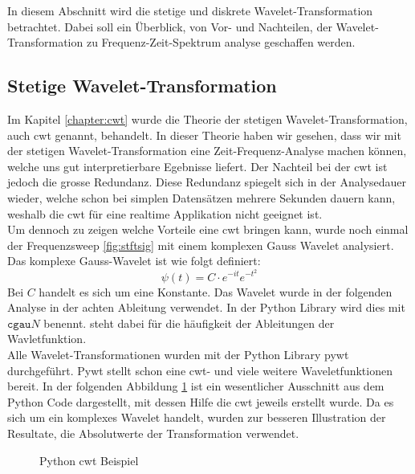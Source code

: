 
In diesem Abschnitt wird die stetige und diskrete Wavelet-Transformation betrachtet. Dabei soll ein Überblick, von Vor- und Nachteilen, der Wavelet-Transformation zu Frequenz-Zeit-Spektrum analyse geschaffen werden. 



\subsection{Stetige Wavelet-Transformation} 
Im Kapitel \ref{chapter:cwt} wurde die Theorie der stetigen Wavelet-Transformation, auch cwt genannt, behandelt. In dieser Theorie haben wir gesehen, dass wir mit der stetigen Wavelet-Transformation eine Zeit-Frequenz-Analyse machen können, welche uns gut interpretierbare Egebnisse liefert. Der Nachteil bei der cwt ist jedoch die grosse Redundanz. Diese Redundanz spiegelt sich in der Analysedauer wieder, welche schon bei simplen Datensätzen mehrere Sekunden dauern kann, weshalb die cwt für eine realtime Applikation nicht geeignet ist.\\
Um dennoch zu zeigen welche Vorteile eine cwt bringen kann, wurde noch einmal der Frequenzsweep \ref{fig:stftsig} mit einem komplexen Gauss Wavelet analysiert. Das komplexe Gauss-Wavelet ist wie folgt definiert:
\begin{equation}
\psi(t)=C \cdot e^{-it} e^{-t^{2}}
\label{eq:cgau}
\end{equation}
Bei $C$ handelt es sich um eine Konstante. Das Wavelet wurde in der folgenden Analyse in der achten Ableitung verwendet. In der Python Library wird dies mit $\texttt{cgau}N$ benennt.  steht dabei für die häufigkeit der Ableitungen der Wavletfunktion.\\

Alle Wavelet-Transformationen wurden mit der Python Library pywt \cite{Lee2019PyWavelets} durchgeführt. Pywt stellt schon eine cwt- und viele weitere Waveletfunktionen bereit. In der folgenden Abbildung \ref{fig:python-cwt} ist ein wesentlicher Ausschnitt aus dem Python Code dargestellt, mit dessen Hilfe die cwt jeweils erstellt wurde. Da es sich um ein komplexes Wavelet handelt, wurden zur besseren Illustration der Resultate, die Absolutwerte der Transformation verwendet.\\

\begin{figure}[!ht]
	\centering
	
	\caption{Python cwt Beispiel}
	\label{fig:python-cwt}
\end{figure}

